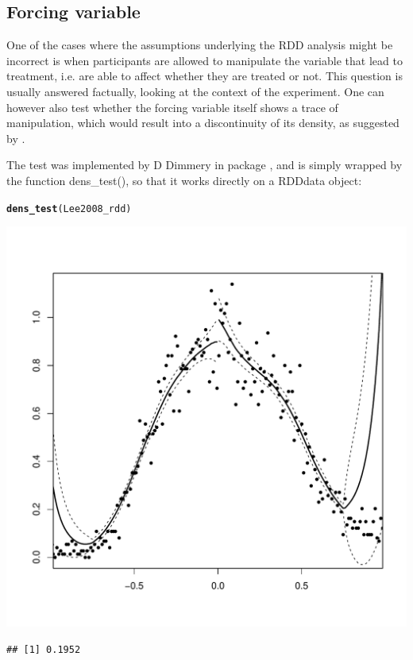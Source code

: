 \documentclass[english,nojss]{jss}\usepackage{graphicx, color}
\makeatletter
\def\maxwidth{ %
  \ifdim\Gin@nat@width>\linewidth
    \linewidth
  \else
    \Gin@nat@width
  \fi
}
\newcommand{\hlfunctioncall}[1]{\textcolor[rgb]{0.501960784313725,0,0.329411764705882}{\textbf{#1}}}%
\newenvironment{kframe}{%
 \def\at@end@of@kframe{}%
 \ifinner\ifhmode%
  \def\at@end@of@kframe{\end{minipage}}%
  \begin{minipage}{\columnwidth}%
 \fi\fi%
 \def\FrameCommand##1{\hskip\@totalleftmargin \hskip-\fboxsep
 \colorbox{shadecolor}{##1}\hskip-\fboxsep
     \hskip-\linewidth \hskip-\@totalleftmargin \hskip\columnwidth}%
 \MakeFramed {\advance\hsize-\width
   \@totalleftmargin\z@ \linewidth\hsize
   \@setminipage}}%
 {\par\unskip\endMakeFramed%
 \at@end@of@kframe}
\newenvironment{knitrout}{}{} %
\makeatother
\begin{document}
\subsection{Forcing variable}

One of the cases where the assumptions underlying the RDD analysis
might be incorrect is when participants are allowed to manipulate
the variable that lead to treatment, i.e. are able to affect whether
they are treated or not. This question is usually answered factually,
looking at the context of the experiment. One can however also test
whether the forcing variable itself shows a trace of manipulation,
which would result into a discontinuity of its density, as suggested
by \citet{McCrary2008}. 

The test was implemented by D Dimmery in package , and is
simply wrapped by the function dens\_test(), so that it works directly
on a RDDdata object:

\begin{knitrout}
\color{fgcolor}\begin{kframe}
\begin{alltt}
\hlfunctioncall{dens_test}(Lee2008_rdd)
\end{alltt}
\end{kframe}
\includegraphics[width=\maxwidth]{figure/unnamed-chunk-16} 
\begin{kframe}\begin{verbatim}
## [1] 0.1952
\end{verbatim}
\end{kframe}
\end{knitrout}
\end{document}
